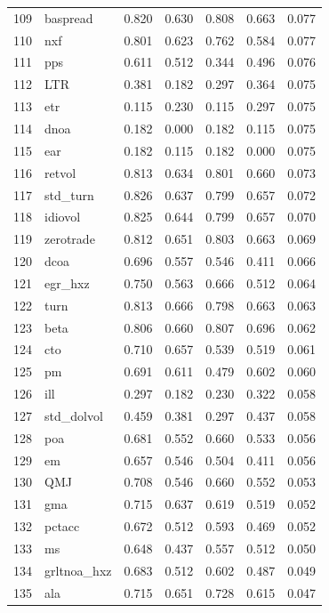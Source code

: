 \begin{footnotesize}
\begin{longtable}{rl|c|c|c|c|c}
		109 & baspread & 0.820 & 0.630 & 0.808 & 0.663 & 0.077 \\ 
		110 & nxf & 0.801 & 0.623 & 0.762 & 0.584 & 0.077 \\ 
		111 & pps & 0.611 & 0.512 & 0.344 & 0.496 & 0.076 \\ 
		112 & LTR & 0.381 & 0.182 & 0.297 & 0.364 & 0.075 \\ 
		113 & etr & 0.115 & 0.230 & 0.115 & 0.297 & 0.075 \\ 
		114 & dnoa & 0.182 & 0.000 & 0.182 & 0.115 & 0.075 \\ 
		115 & ear & 0.182 & 0.115 & 0.182 & 0.000 & 0.075 \\ 
		116 & retvol & 0.813 & 0.634 & 0.801 & 0.660 & 0.073 \\ 
		117 & std\_turn & 0.826 & 0.637 & 0.799 & 0.657 & 0.072 \\ 
		118 & idiovol & 0.825 & 0.644 & 0.799 & 0.657 & 0.070 \\ 
		119 & zerotrade & 0.812 & 0.651 & 0.803 & 0.663 & 0.069 \\ 
		120 & dcoa & 0.696 & 0.557 & 0.546 & 0.411 & 0.066 \\ 
		121 & egr\_hxz & 0.750 & 0.563 & 0.666 & 0.512 & 0.064 \\ 
		122 & turn & 0.813 & 0.666 & 0.798 & 0.663 & 0.063 \\ 
		123 & beta & 0.806 & 0.660 & 0.807 & 0.696 & 0.062 \\ 
		124 & cto & 0.710 & 0.657 & 0.539 & 0.519 & 0.061 \\ 
		125 & pm & 0.691 & 0.611 & 0.479 & 0.602 & 0.060 \\ 
		126 & ill & 0.297 & 0.182 & 0.230 & 0.322 & 0.058 \\ 
		127 & std\_dolvol & 0.459 & 0.381 & 0.297 & 0.437 & 0.058 \\ 
		128 & poa & 0.681 & 0.552 & 0.660 & 0.533 & 0.056 \\ 
		129 & em & 0.657 & 0.546 & 0.504 & 0.411 & 0.056 \\ 
		130 & QMJ & 0.708 & 0.546 & 0.660 & 0.552 & 0.053 \\ 
		131 & gma & 0.715 & 0.637 & 0.619 & 0.519 & 0.052 \\ 
		132 & pctacc & 0.672 & 0.512 & 0.593 & 0.469 & 0.052 \\ 
		133 & ms & 0.648 & 0.437 & 0.557 & 0.512 & 0.050 \\ 
		134 & grltnoa\_hxz & 0.683 & 0.512 & 0.602 & 0.487 & 0.049 \\ 
		135 & ala & 0.715 & 0.651 & 0.728 & 0.615 & 0.047 \\ 

\end{longtable}
\end{footnotesize}
